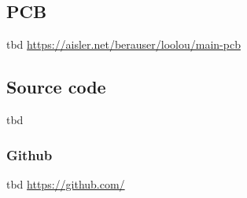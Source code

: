 \subsection{PCB}

tbd %
\href{https://aisler.net/berauser/loolou/main-pcb}{https://aisler.net/berauser/loolou/main-pcb}

\subsection{Source code}
tbd %
\subsubsection{Github}

tbd %
\href{https://github.com/}{https://github.com/}
\vspace{0.5cm}

